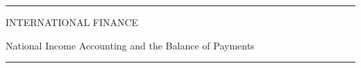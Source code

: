 \documentclass[12pt,aspectratio=169]{beamer}
\begin{document}
\begin{frame}

\begin{center}

\rule{\textwidth}{2pt}

\vskip3mm
INTERNATIONAL FINANCE

National Income Accounting and the Balance of Payments
\rule{\textwidth}{2pt}

\end{center}

\end{frame}


\end{document}
